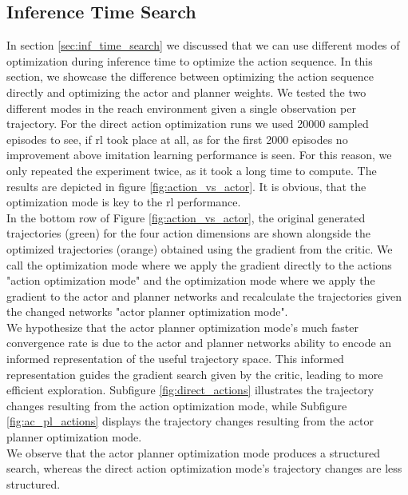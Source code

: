 \subsection{Inference Time Search}
\label{ref:com_opt_modes}
In section \ref{sec:inf_time_search} we discussed that we can use different modes of optimization during inference time to optimize the action sequence. In this section, 
we showcase the difference between optimizing the action sequence directly and optimizing the actor and planner weights. We tested the two different 
modes in the reach environment given a single observation per trajectory. For the direct 
action optimization runs we used 20000 sampled episodes to see, if \ac{rl} took place at all, as for the first 2000 episodes no improvement above 
imitation learning performance is seen. For this reason, we only repeated the experiment twice, as it took a long time to compute. The results are depicted in figure 
\ref{fig:action_vs_actor}. It is obvious, that the optimization mode is key to the \ac{rl} performance. \\

In the bottom row of Figure \ref{fig:action_vs_actor}, the original generated trajectories (green) for the four action dimensions 
are shown alongside the optimized trajectories (orange) obtained using the gradient from the critic. We call the optimization mode 
where we apply the gradient directly to the actions "action optimization mode" and the optimization mode where we apply 
the gradient to the actor and planner networks and recalculate the trajectories given the changed networks "actor planner 
optimization mode".\\

We hypothesize that 
the actor planner optimization mode's much faster convergence rate is due to the actor and planner networks ability to 
encode an informed representation of the useful trajectory space. This informed representation guides the gradient search 
given by the critic, leading to more efficient exploration. Subfigure \ref{fig:direct_actions} illustrates the trajectory 
changes resulting from the action optimization mode, while Subfigure \ref{fig:ac_pl_actions} displays 
the trajectory changes resulting from the actor planner optimization mode. \\

We observe that the actor planner 
optimization mode produces a structured search, whereas the direct action optimization mode's trajectory changes are less structured.\\

